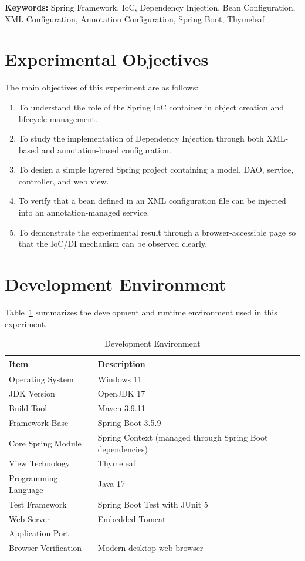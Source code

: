 \documentclass[12pt,a4paper]{article}
\begin{document}
\noindent\textbf{Keywords:} Spring Framework, IoC, Dependency Injection, Bean Configuration, XML Configuration, Annotation Configuration, Spring Boot, Thymeleaf

\tableofcontents
\newpage


\section{Experimental Objectives}
The main objectives of this experiment are as follows:
\begin{enumerate}
    \item To understand the role of the Spring IoC container in object creation and lifecycle management.
    \item To study the implementation of Dependency Injection through both XML-based and annotation-based configuration.
    \item To design a simple layered Spring project containing a model, DAO, service, controller, and web view.
    \item To verify that a bean defined in an XML configuration file can be injected into an annotation-managed service.
    \item To demonstrate the experimental result through a browser-accessible page so that the IoC/DI mechanism can be observed clearly.
\end{enumerate}

\section{Development Environment}
Table~\ref{tab:environment} summarizes the development and runtime environment used in this experiment.

\begin{table}[H]
    \centering
    \caption{Development Environment}
    \label{tab:environment}
    \begin{tabular}{>{\raggedright\arraybackslash}p{4cm} >{\raggedright\arraybackslash}p{9.5cm}}
        \toprule
        Item & Description \\
        \midrule
        Operating System & Windows 11 \\
        JDK Version & OpenJDK 17 \\
        Build Tool & Maven 3.9.11 \\
        Framework Base & Spring Boot 3.5.9 \\
        Core Spring Module & Spring Context (managed through Spring Boot dependencies) \\
        View Technology & Thymeleaf \\
        Programming Language & Java 17 \\
        Test Framework & Spring Boot Test with JUnit 5 \\
        Web Server & Embedded Tomcat \\
        Application Port & 8000 \\
        Browser Verification & Modern desktop web browser \\
        \bottomrule
    \end{tabular}
\end{table}
\end{document}
